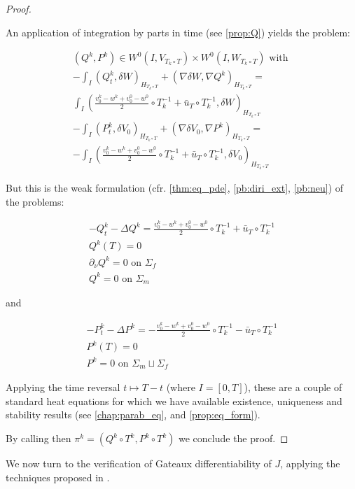 \documentclass[english,a4paper,10pt,oneside]{scrbook}	%
\theoremstyle{break}
\newenvironment{mproof}[1][\proofname]{%
  \begin{proof}[#1]$ $\par\nobreak\ignorespaces
}{%
  \end{proof}
}
\renewcommand*{\proofname}{Proof}
\theoremstyle{remark}
\begin{document}
\begin{mproof}
An application of integration by parts in time (see \cref{prop:Q}) yields the problem:

\begin{align*}
(Q^k, P^k) \in W^0(I, V_{T_k \circ T})\times W^0(I, W_{T_k \circ T}) \text{ with }\\
-\int_I ( Q^k_t, \delta W )_{H_{T_k \circ T}}+ (\nabla \delta W, \nabla Q^k)_{H_{T_k \circ T}} =\\ \int_I \left (\frac{v_0^k-w^k+v_0^0-w^0}{2}\circ T_k^{-1}+\bar{u}_T\circ T_k^{-1} ,\delta W\right)_{H_{T_k \circ T}}\\
-\int_I( P^k_t, \delta V_0)_{H_{T_k \circ T}} + ( \nabla \delta V_0, \nabla P^k)_{H_{T_k \circ T}} =\\- \int_I \left (\frac{v_0^k-w^k+v_0^0-w^0}{2}\circ T_k^{-1}+\bar{u}_T\circ T_k^{-1} ,\delta V_0\right)_{H_{T_k \circ T}}
\end{align*}

But this is the weak formulation (cfr. \cref{thm:eq_pde}, \cref{pb:diri_ext}, \cref{pb:neu}) of the problems:

\begin{align*}
-Q^k_t-\Delta Q^k =\frac{v_0^k-w^k+v_0^0-w^0}{2}\circ T_k^{-1}+\bar{u}_T\circ T_k^{-1} \\
Q^k(T)=0\\
\partial_\nu Q^k = 0 \text{ on } \Sigma_f\\
Q^k = 0 \text{ on } \Sigma_m
\end{align*}

and

\begin{align*}
-P^k_t-\Delta P^k =-\frac{v_0^k-w^k+v_0^0-w^0}{2}\circ T_k^{-1}-\bar{u}_T\circ T_k^{-1} \\
P^k(T)=0\\
P^k = 0 \text{ on } \Sigma_m \sqcup \Sigma_f
\end{align*}

Applying the time reversal $t\mapsto T -t$ (where $I = [0,T]$), these are a couple of standard heat equations for which we have available existence, uniqueness and stability results (see \cref{chap:parab_eq}, and \cref{prop:eq_form}).

By calling then $\pi^k = (Q^k \circ T^k,P^k \circ T^k)$ we conclude the proof.

\end{mproof}

We now turn to the verification of Gateaux differentiability of $J$, applying the techniques proposed in \cite{avg_adj}.
\end{document}
